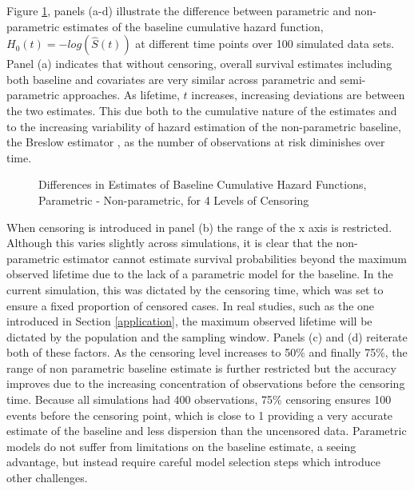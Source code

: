 Figure \ref{fig:rightdiff}, panels (a-d) illustrate the difference between parametric and non-parametric estimates of the baseline cumulative hazard function, $H_0(t) = -log(\hat{S}(t))$ at different time points over 100 simulated data sets.  Panel (a) indicates that without censoring, overall survival estimates including both baseline and covariates are very similar across parametric and semi-parametric approaches.  As lifetime, $t$ increases, increasing deviations are between the two estimates. This due both to the cumulative nature of the estimates and to the increasing variability of hazard estimation of the non-parametric baseline, the Breslow estimator \citep{davison1997,Burr1994}, as the number of observations at risk diminishes over time.

\begin{figure}[h!]
	\centering
	\quad
	\quad
	\quad
	\caption{Differences in Estimates of Baseline Cumulative Hazard Functions, Parametric - Non-parametric, for 4 Levels of Censoring}
	\label{fig:rightdiff}
\end{figure}
When censoring is introduced in panel (b) the range of the x axis is restricted.  Although this varies slightly across simulations, it is clear that the non-parametric estimator cannot estimate survival probabilities beyond the maximum observed lifetime due to the lack of a parametric model for the baseline.  In the current simulation, this was dictated by the censoring time, which was set to ensure a fixed proportion of censored cases.  In real studies, such as the one introduced in Section \ref{application}, the maximum observed lifetime will be dictated by the population and the sampling window. Panels (c) and (d) reiterate both of these factors. As the censoring level increases to 50\% and finally 75\%, the range of non parametric baseline estimate is further restricted but the accuracy improves due to the increasing concentration of observations before the censoring time.  Because all simulations had 400 observations, 75\% censoring ensures 100 events before the censoring point, which is close to 1 providing a very accurate estimate of the baseline and less dispersion than the uncensored data.  Parametric models do not suffer from limitations on the baseline estimate, a seeing advantage, but instead require careful model selection steps which introduce other challenges.
